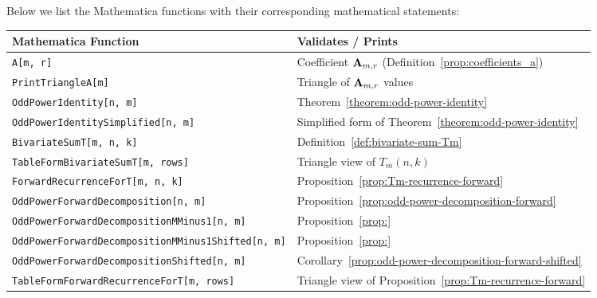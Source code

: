 Below we list the Mathematica functions with their corresponding mathematical statements:
\begin{center}
    \renewcommand{\arraystretch}{1.3}
    \begin{tabular}{ll}
        \toprule
        \textbf{Mathematica Function}                              & \textbf{Validates / Prints}                                        \\
        \midrule
        \texttt{A[m, r]}                                           & Coefficient ${\mathbf{A}} \sb{m,r}$ (Definition~\ref{prop:coefficients_a}) \\
        \texttt{PrintTriangleA[m]}                                 & Triangle of ${\mathbf{A}} \sb{m,r}$ values                                 \\
        \texttt{OddPowerIdentity[n, m]}                            & Theorem~\ref{theorem:odd-power-identity}                           \\
        \texttt{OddPowerIdentitySimplified[n, m]}                  & Simplified form of Theorem~\ref{theorem:odd-power-identity}        \\
        \texttt{BivariateSumT[m, n, k]}                            & Definition~\ref{def:bivariate-sum-Tm}                              \\
        \texttt{TableFormBivariateSumT[m, rows]}                   & Triangle view of $T_m(n, k)$                                       \\
        \texttt{ForwardRecurrenceForT[m, n, k]}                    & Proposition~\ref{prop:Tm-recurrence-forward}                       \\
        \texttt{OddPowerForwardDecomposition[n, m]}                & Proposition~\ref{prop:odd-power-decomposition-forward}             \\
        \texttt{OddPowerForwardDecompositionMMinus1[n, m]}         & Proposition~\ref{prop:}                                            \\
        \texttt{OddPowerForwardDecompositionMMinus1Shifted[n, m]}  & Proposition~\ref{prop:}                                            \\
        \texttt{OddPowerForwardDecompositionShifted[n, m]}         & Corollary~\ref{prop:odd-power-decomposition-forward-shifted}       \\
        \texttt{TableFormForwardRecurrenceForT[m, rows]}           & Triangle view of Proposition~\ref{prop:Tm-recurrence-forward}      \\

\end{tabular}
\end{center}
